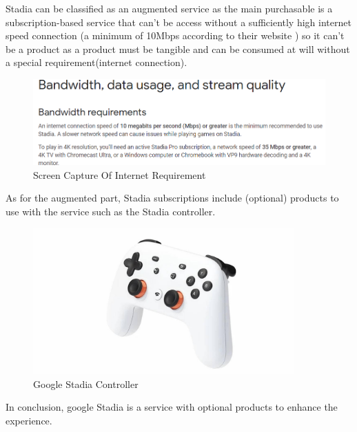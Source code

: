 Stadia can be classified as an augmented service as the main purchasable is a subscription-based service that can't be access without a sufficiently high internet speed connection (a minimum of 10Mbps according to their website \cite{stadiaSupport}) so it can't 
be a product as a product must be tangible and can be consumed at will without a special requirement(internet connection).

\begin{figure}[H]
    \centering
    \includegraphics[width=13cm]{images/bandwidth.png}
    \caption{Screen Capture Of Internet Requirement}
    \label{fig:internetReq}
\end{figure}

As for the augmented part, Stadia subscriptions include (optional) products to use 
with the service such as the Stadia controller.

\begin{figure}[H]
    \centering
    \includegraphics[width=10cm]{images/controller.jpg}
    \caption{Google Stadia Controller}
    \label{fig:controller}
\end{figure}

In conclusion, google Stadia is a service with optional products to enhance the 
experience.
